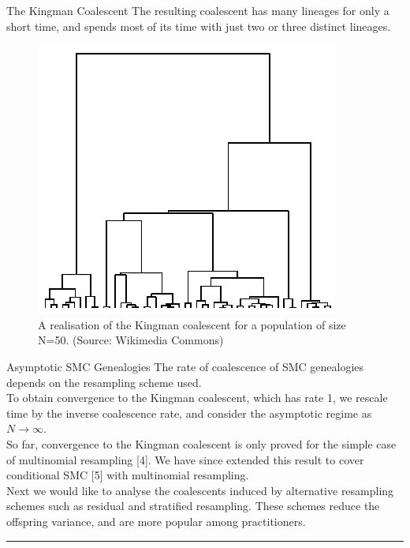 \documentclass[final, 12pt]{beamer}
\newlength{\colwidth}
\begin{document}
\begin{frame}
\begin{columns}
\begin{column}{\colwidth}
\begin{block}{The Kingman Coalescent}
The resulting coalescent has many lineages for only a short time, and spends most of its time with just two or three distinct lineages.
\begin{figure}
\includegraphics[width=0.8\colwidth]{../kingman.png}
\caption{A realisation of the Kingman coalescent for a population of size N=50. \textmd{(Source: Wikimedia Commons)}}
\end{figure}
\end{block}

\begin{block}{Asymptotic SMC Genealogies}
The rate of coalescence of SMC genealogies depends on the resampling scheme used. \\[10pt]

To obtain convergence to the Kingman coalescent, which has rate 1, we rescale time by the inverse coalescence rate, and consider the asymptotic regime as  $N\to\infty$.\\[10pt]

So far, convergence to the Kingman coalescent is only proved for the simple case of multinomial resampling [4]. We have since extended this result to cover conditional SMC [5] with multinomial resampling.\\[10pt]

Next we would like to analyse the coalescents induced by alternative resampling schemes such as residual and stratified resampling. These schemes reduce the offspring variance, and are more popular among practitioners.
\end{block}

\vspace*{50pt}

\hrule
\begin{block}


\end{block}
\end{column}
\end{columns}
\end{frame}
\end{document}
